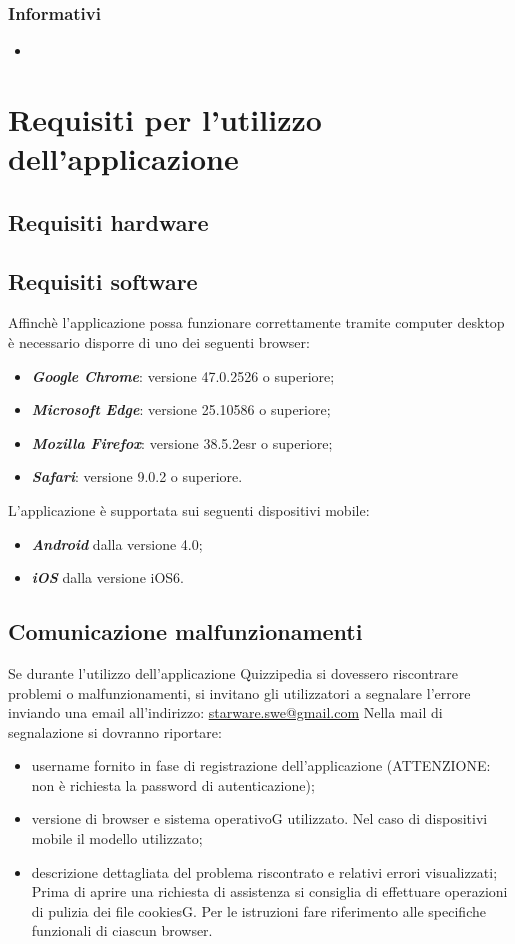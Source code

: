\documentclass[12pt,a4paper]{article}
\begin{document}
	\subsubsection{Informativi}
	\begin{itemize}
		\item 
	\end{itemize}
	
	\newpage
	\section{Requisiti per l'utilizzo dell'applicazione} 
	\subsection{Requisiti hardware}
	
	\subsection{Requisiti software}
	
	Affinchè l’applicazione possa funzionare correttamente tramite computer desktop è
	necessario disporre di uno dei seguenti browser:
	\begin{itemize}
		\item \textit{\textbf{Google Chrome}}: versione  47.0.2526 o superiore;
		\item \textit{\textbf{Microsoft Edge}}: versione 25.10586 o superiore;
	\item \textit{\textbf{Mozilla Firefox}}: versione 38.5.2esr o superiore;
	\item\textit{	\textbf{Safari}}: versione 9.0.2 o superiore.
	\end{itemize}
 L'applicazione è supportata sui seguenti dispositivi mobile:
	\begin{itemize}
	\item \textit{\textbf{Android}} dalla versione 4.0;
	\item \textit{\textbf{iOS}} dalla versione iOS6.
\end{itemize}
	\subsection{Comunicazione malfunzionamenti}
	Se durante l’utilizzo dell’applicazione Quizzipedia si dovessero riscontrare problemi o
	malfunzionamenti, si invitano gli utilizzatori a segnalare l’errore inviando una email
	all’indirizzo:
	\url{starware.swe@gmail.com}
	Nella mail di segnalazione si dovranno riportare:
	\begin{itemize}
	\item username fornito in fase di registrazione dell’applicazione (ATTENZIONE:
	non è richiesta la password di autenticazione);
	\item versione di browser e sistema operativoG utilizzato. Nel caso di dispositivi
	mobile il modello utilizzato;
	\item descrizione dettagliata del problema riscontrato e relativi errori visualizzati;
	Prima di aprire una richiesta di assistenza si consiglia di effettuare operazioni di
	pulizia dei file cookiesG. Per le istruzioni fare riferimento alle specifiche funzionali di
	ciascun browser.
	\end{itemize}
	\newpage
\end{document}
